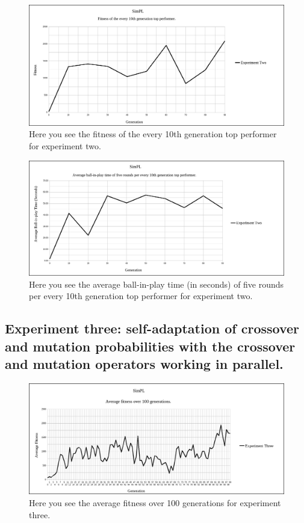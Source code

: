\documentclass[a4paper,10pt]{article}
\begin{document}
\begin{figure}[H]  
  \centering
  \includegraphics[width=1\textwidth]{figures/exp2_10_tops.png}
  \caption{Here you see the fitness of the every 10th generation top performer for experiment two.}
  \label{fig:exp2_10_tops}
\end{figure}

\begin{figure}[H]  
  \centering
  \includegraphics[width=1\textwidth]{figures/exp2_10_tops_times.png}
  \caption{Here you see the average ball-in-play time (in seconds) of five rounds per every 10th generation top performer for experiment two.}
  \label{fig:exp2_10_tops_times}
\end{figure}

\subsection{Experiment three: self-adaptation of crossover and mutation probabilities with the crossover and mutation operators working in parallel.}

\begin{figure}[H]  
  \centering
  \includegraphics[width=1\textwidth]{figures/exp3_avg_fit.png}
  \caption{Here you see the average fitness over 100 generations for experiment three.}
  \label{fig:exp3_avg_fit}
\end{figure}
\end{document}
